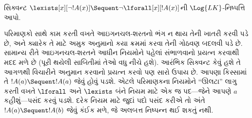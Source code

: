 
\label{guunit:OLP-0076}


\begin{ex}
સિક્વન્ટ $\lexists[x][\lnot !A(x)] \Sequent
\lnot \lforall[x][!A(x)]$ની $\Log{LK}$-નિષ્પત્તિ આપો.

પરિમાણકો સાથે કામ કરતી વખતે આઇગનચલ-શરતનો ભંગ ન થાય તેની ખાતરી કરવી
પડે છે, અને ક્યારેક તે માટે અમુક અનુમાનો કયા ક્રમમાં કરવા તેની ગોઠવણ
બદલવી પડે છે. સામાન્ય રીતે આઇગનચલ-શરતને આધીન નિયમોને પહેલાં સંભાળવાનો
પ્રયત્ન કરવાથી મદદ મળે છે (પૂરી થયેલી સાબિતીમાં તેઓ વધુ નીચે હશે).
આરંભિક સિક્વન્ટ કેવું હશે તે આગળથી વિચારીને અનુમાન કરવાનો પ્રયત્ન કરવો
પણ સારો ઉપાય છે. આપણા કિસ્સામાં તે $!A(a) \Sequent !A(a)$ જેવું હોવું
પડશે. એટલે પરિમાણકના નિયમોને ``ઊલટા'' લાગુ કરતી વખતે $\lforall$ અને
$\lexists$ બંને નિયમ માટે એક જ પદ—જેને આપણે $a$ કહીશું—પસંદ કરવું પડશે.
દરેક નિયમ માટે જુદાં પદો પસંદ કરીએ તો અંતે $!A(a) \Sequent !A(b)$ જેવું
કંઈક મળે, જે અલબત્ત નિષ્પન્ન થઈ શકતું નથી.


\end{ex}
